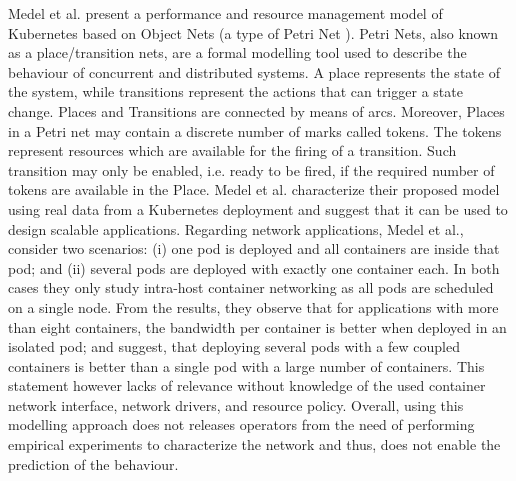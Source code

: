 \documentclass[conference]{IEEEtran}
\begin{document}
Medel et al. \cite{UCC_2016:Medel} present a performance and resource management model of Kubernetes based on Object Nets \cite{ObjectNets} (a type of Petri Net \cite{PetriNets}). Petri Nets, also known as a place/transition nets, are a formal modelling tool used to describe the behaviour of concurrent and distributed systems. A place represents the state of the system, while transitions represent the actions that can trigger a state change. Places and Transitions are connected by means of arcs. Moreover, Places in a Petri net may contain a discrete number of marks called tokens. The tokens represent resources which are available for the firing of a transition. Such transition may only be enabled, i.e. ready to be fired, if the required number of tokens are available in the Place. Medel et al. characterize their proposed model using real data from a Kubernetes deployment and suggest that it can be used to design scalable applications. Regarding network applications, Medel et al., consider two scenarios: (i) one pod is deployed and all containers are inside that pod; and (ii) several pods are deployed with exactly one container each. In both cases they only study intra-host container networking as all pods are scheduled on a single node. From the results, they observe that for applications with more than eight containers, the bandwidth per container is better when deployed in an isolated pod; and suggest, that deploying several pods with a few coupled containers is better than a single pod with a large number of containers. This statement however lacks of relevance without knowledge of the used container network interface, network drivers, and resource policy. Overall, using this modelling approach does not releases operators from the need of performing empirical experiments to characterize the network and thus, does not enable the prediction of the behaviour.
\end{document}
